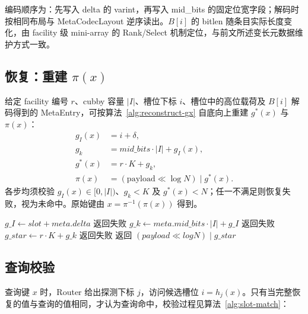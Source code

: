 编码顺序为：先写入 delta 的 varint，再写入 mid\_bits 的固定位宽字段；解码时按相同布局与 MetaCodecLayout 逆序读出。\(B[i]\) 的 bitlen 随条目实际长度变化，由 facility 级 mini-array 的 Rank/Select 机制定位，与前文所述变长元数据维护方式一致。

\subsection{恢复：重建 \texorpdfstring{\(\pi(x)\)}{pi(x)}}

给定 facility 编号 \(r\)、cubby 容量 \(|I|\)、槽位下标 \(i\)、槽位中的高位载荷及 \(B[i]\) 解码得到的 MetaEntry，可按算法~\ref{alg:reconstruct-gx} 自底向上重建 \(g^\ast(x)\) 与 \(\pi(x)\)：
\begin{align}
  g_I(x) &= i+\delta, \\
  g_k &= mid\_bits \cdot|I|+g_I(x), \\
  g^\ast(x) &= r\cdot K+g_k, \\
  \pi(x) &= (\mathrm{payload}\ll\log N)\;\vert\; g^\ast(x).
\end{align}
各步均须校验 \(g_I(x)\in[0,|I|)\)、\(g_k<K\) 及 \(g^\ast(x)<N\)；任一不满足则恢复失败，视为未命中。原始键由 \(x=\pi^{-1}(\pi(x))\) 得到。

\begin{algorithm}[htbp]
  \caption{ReconstructGxPi：从槽位上下文恢复 \(\pi(x)\)}
  \label{alg:reconstruct-gx}
  \begin{algorithmic}[1]
      \State $\mathit{g\_I}\gets \mathit{slot}+\mathit{meta.delta}$
      \If{$\mathit{g\_I}\notin[0,|I|)$} \State 返回失败 \EndIf
      \State $\mathit{g\_k}\gets \mathit{meta.mid\_bits}\cdot|I|+\mathit{g\_I}$
       \State 返回失败 \EndIf
      \State $\mathit{g\_star}\gets r\cdot K+\mathit{g\_k}$
       \State 返回失败 \EndIf
      \State 返回 $(\mathit{payload}\ll\mathit{logN})\;\vert\;\mathit{g\_star}$
    \EndFunction
  \end{algorithmic}
\end{algorithm}

\subsection{查询校验}

查询键 \(x\) 时，Router 给出探测下标 \(j\)，访问候选槽位 \(i=h_j(x)\)。只有当完整恢复的值与查询的值相同，才认为查询命中，校验过程见算法~\ref{alg:slot-match}：

